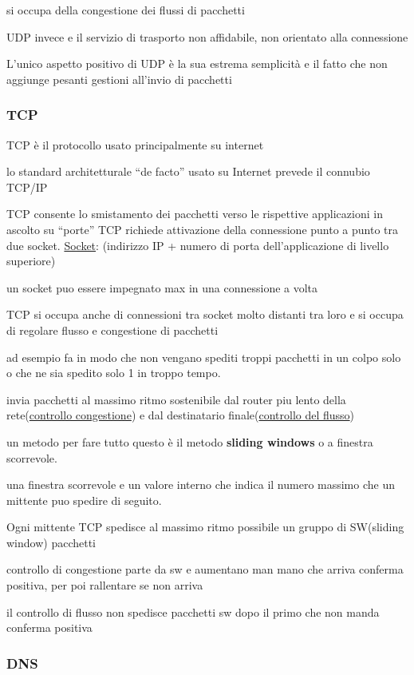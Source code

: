 \documentclass[12pt]{article}
\begin{document}
si occupa della congestione dei flussi di pacchetti

UDP invece e il servizio di trasporto non affidabile, non orientato alla connessione

L’unico aspetto positivo di UDP è la sua estrema semplicità e il fatto che non aggiunge pesanti gestioni all’invio di pacchetti

\subsubsection{TCP}

TCP è il protocollo usato principalmente su internet

lo standard architetturale “de facto” usato su Internet prevede il connubio TCP/IP

TCP consente lo smistamento dei pacchetti verso le rispettive applicazioni in ascolto su
“porte”
 TCP richiede attivazione della connessione punto a punto tra due socket.
\underline{Socket}: (indirizzo IP + numero di porta dell’applicazione di livello superiore)

un socket puo essere impegnato max in una connessione a volta

TCP si occupa anche di connessioni tra socket molto distanti tra loro e si occupa di regolare flusso e congestione di pacchetti

ad esempio fa in modo che non vengano spediti troppi pacchetti in un colpo solo o che ne sia spedito solo 1 in troppo tempo.

invia pacchetti al massimo ritmo sostenibile dal router piu lento della rete(\underline{controllo congestione}) e dal destinatario finale(\underline{controllo del flusso})

un metodo per fare tutto questo è il metodo \textbf{sliding windows} o a finestra scorrevole.

una finestra scorrevole e un valore interno che indica il numero massimo che un mittente puo spedire di seguito.

Ogni mittente TCP spedisce al massimo ritmo possibile un gruppo di SW(sliding window) pacchetti

controllo di congestione parte da sw e aumentano man mano che arriva conferma positiva, per poi rallentare se non arriva

il controllo di flusso non spedisce pacchetti sw dopo il primo che non manda conferma positiva


\subsubsection{DNS}
\end{document}

